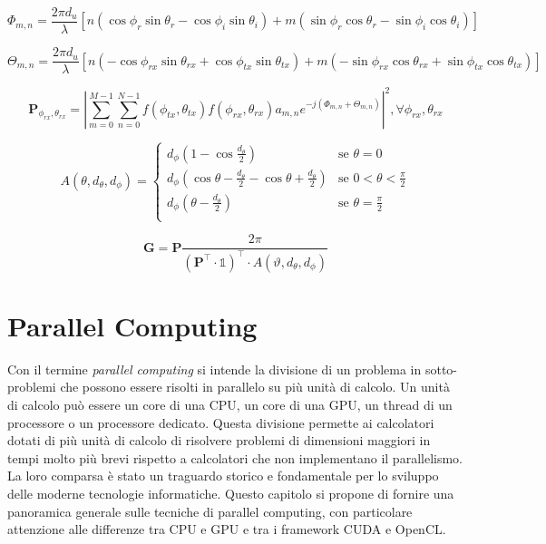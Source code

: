 \begin{equation}
  \label{eq:phase-phi}\Phi_{m,n}= \frac{2\pi d_{u}}{\lambda}[n(\cos{\phi_{r}\sin{\theta_{r}}}
  -\cos{\phi_{i}}\sin{\theta_{i}})+m(\sin{\phi_{r}}\cos{\theta_{r}}-\sin{\phi_{i}}
  \cos{\theta_{i}})]
\end{equation}

\begin{equation}
  \label{eq:phase-theta}\Theta_{m,n}= \frac{2\pi d_{u}}{\lambda}[n(-\cos{\phi_{rx}\sin{\theta_{rx}}}
  +\cos{\phi_{tx}}\sin{\theta_{tx}})+m(-\sin{\phi_{rx}}\cos{\theta_{rx}}+\sin{\phi_{tx}}
  \cos{\theta_{tx}})]
\end{equation}

\begin{equation}
  \label{eq:power}\textbf{P}_{\phi_{rx},\theta_{rx}}= \left|\sum_{m=0}^{M-1}{\sum_{n=0}^{N-1}{f(\phi_{tx}, \theta_{tx})f(\phi_{rx},\theta_{rx})a_{m,n}e^{-j(\Phi_{m,n}+\Theta_{m,n})}}}
  \right|^{2}, \forall \phi_{rx}, \theta_{rx}
\end{equation}

\begin{equation}
  \label{eq:area-spherical-element}A(\theta, d_{\theta}, d_{\phi})=
  \begin{cases}
    d_{\phi}(1-\cos{\frac{d_{\theta}}{2}})                                         & \text{se }\theta = 0                 \\
    d_{\phi}(\cos{\theta-\frac{d_{\theta}}{2}}- \cos{\theta+\frac{d_{\theta}}{2}}) & \text{se }0 < \theta < \frac{\pi}{2} \\
    d_{\phi}(\theta-\frac{d_{\theta}}{2})                                          & \text{se }\theta = \frac{\pi}{2}     \\
  \end{cases}
\end{equation}

\begin{equation}
  \label{eq:gain}\textbf{G}=\textbf{P}\frac{2\pi}{(\textbf{P}^{\top}\cdot
  \mathds{1})^{\top}\cdot A(\vartheta, d_{\theta}, d_{\phi})}
\end{equation}

\section{Parallel Computing}
\label{sec:parallelcomputing}

Con il termine \textit{parallel computing} si intende la divisione di un problema
in sotto-problemi che possono essere risolti in parallelo su più unità di calcolo.
Un unità di calcolo può essere un core di una CPU, un core di una GPU, un thread
di un processore o un processore dedicato. Questa divisione permette ai calcolatori
dotati di più unità di calcolo di risolvere problemi di dimensioni maggiori in tempi
molto più brevi rispetto a calcolatori che non implementano il parallelismo. La
loro comparsa è stato un traguardo storico e fondamentale per lo sviluppo delle
moderne tecnologie informatiche. Questo capitolo si propone di fornire una panoramica
generale sulle tecniche di parallel computing, con particolare attenzione alle
differenze tra CPU e GPU e tra i framework CUDA e OpenCL.

